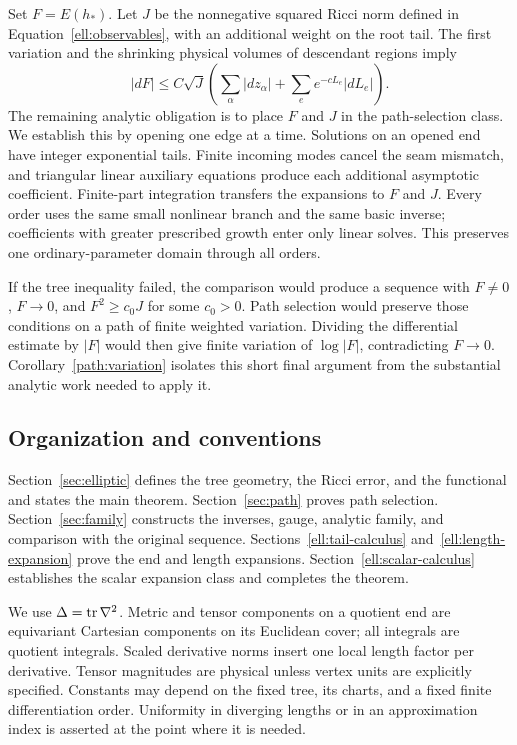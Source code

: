 Set $F=E(h_*)$. Let $J$ be the nonnegative squared Ricci norm defined
in Equation~\eqref{ell:observables}, with an additional weight on the
root tail. The first variation and the shrinking physical volumes of
descendant regions imply
\[
 |dF|\le C\sqrt J
 \left(\sum_\alpha|dz_\alpha|+\sum_e e^{-cL_e}|dL_e|\right).
\]
The remaining analytic obligation is to place $F$ and $J$ in the
path-selection class. We establish this by opening one edge at a
time. Solutions on an opened end have integer exponential tails.
Finite incoming modes cancel the seam mismatch, and triangular linear
auxiliary equations produce each additional asymptotic coefficient.
Finite-part integration transfers the expansions to $F$ and $J$.
Every order uses the same small nonlinear branch and the same basic
inverse; coefficients with greater prescribed growth enter only
linear solves. This preserves one ordinary-parameter domain through
all orders.

If the tree inequality failed, the comparison would produce a sequence
with $F\ne0$, $F\to0$, and $F^2\ge c_0J$ for some $c_0>0$.
Path selection would preserve those conditions on a path of finite
weighted variation. Dividing the differential estimate by $|F|$
would then give finite variation of $\log|F|$, contradicting
$F\to0$. Corollary~\ref{path:variation} isolates this short final
argument from the substantial analytic work needed to apply it.

\subsection{Organization and conventions}

Section~\ref{sec:elliptic} defines the tree geometry, the Ricci error,
and the functional and states the main theorem.
Section~\ref{sec:path} proves path selection.
Section~\ref{sec:family} constructs the inverses, gauge, analytic family,
and comparison with the original sequence.
Sections~\ref{ell:tail-calculus} and~\ref{ell:length-expansion}
prove the end and length expansions.
Section~\ref{ell:scalar-calculus} establishes the scalar expansion
class and completes the theorem.

We use $\Delta=\operatorname{tr}\nabla^2$. Metric and tensor components on a quotient
end are equivariant Cartesian components on its Euclidean cover;
all integrals are quotient integrals. Scaled derivative norms insert
one local length factor per derivative. Tensor magnitudes are physical
unless vertex units are explicitly specified. Constants may depend on
the fixed tree, its charts, and a fixed finite differentiation order.
Uniformity in diverging lengths or in an approximation index is
asserted at the point where it is needed.
